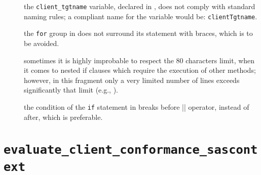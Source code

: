 \begin{description}
	
	\item []
		the \verb|client_tgtname| variable, declared in , does not comply with standard naming rules; a compliant name for the variable would be: \verb|clientTgtname|.
	
	\item [] 
		the \verb|for| group in  does not surround its statement with braces, which is to be avoided.
	
	\item []
		sometimes it is highly improbable to respect the 80 characters limit, when it comes to nested if clauses which require the execution of other methods; however, in this fragment only a very limited number of lines exceeds significantly that limit (e.g., ).
	
	\item []
		the condition of the \verb|if| statement in  breaks before \verb|||| operator, instead of after, which is preferable.
	
\end{description}




















\section{\normalfont\texttt{evaluate\_client\_conformance\_sascontext}}


